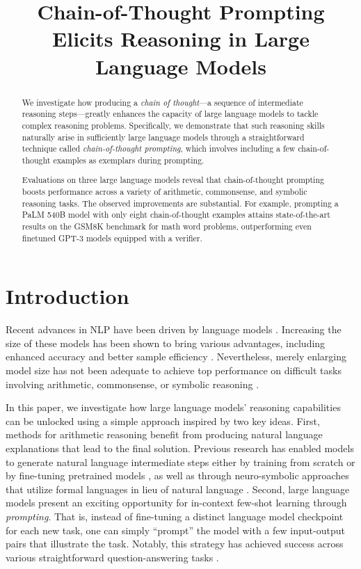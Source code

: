\title{Chain-of-Thought Prompting Elicits Reasoning in Large Language Models}

\begin{abstract}
We investigate how producing a \textit{chain of thought}—a sequence of intermediate reasoning steps—greatly enhances the capacity of large language models to tackle complex reasoning problems. Specifically, we demonstrate that such reasoning skills naturally arise in sufficiently large language models through a straightforward technique called \textit{chain-of-thought prompting}, which involves including a few chain-of-thought examples as exemplars during prompting.

Evaluations on three large language models reveal that chain-of-thought prompting boosts performance across a variety of arithmetic, commonsense, and symbolic reasoning tasks. The observed improvements are substantial. For example, prompting a PaLM 540B model with only eight chain-of-thought examples attains state-of-the-art results on the GSM8K benchmark for math word problems, outperforming even finetuned GPT-3 models equipped with a verifier.
\end{abstract}

\section{Introduction}
Recent advances in NLP have been driven by language models \citep[][\textit{inter alia}]{peters-etal-2018-deep,devlin-etal-2019-bert,brown2020language}. Increasing the size of these models has been shown to bring various advantages, including enhanced accuracy and better sample efficiency \citep[\textit{inter alia}]{kaplan2020scaling,brown2020language}. Nevertheless, merely enlarging model size has not been adequate to achieve top performance on difficult tasks involving arithmetic, commonsense, or symbolic reasoning \citep{rae2021scaling}.

In this paper, we investigate how large language models' reasoning capabilities can be unlocked using a simple approach inspired by two key ideas. First, methods for arithmetic reasoning benefit from producing natural language explanations that lead to the final solution. Previous research has enabled models to generate natural language intermediate steps either by training from scratch \citep{ling-etal-2017-program} or by fine-tuning pretrained models \citep{cobbe2021training}, as well as through neuro-symbolic approaches that utilize formal languages in lieu of natural language \citep{roy-roth-2015-solving, chiang-chen-2019-semantically,amini-etal-2019-mathqa, chen2019neural}. Second, large language models present an exciting opportunity for in-context few-shot learning through \emph{prompting}. That is, instead of fine-tuning a distinct language model checkpoint for each new task, one can simply “prompt” the model with a few input-output pairs that illustrate the task. Notably, this strategy has achieved success across various straightforward question-answering tasks \citep{brown2020language}.

